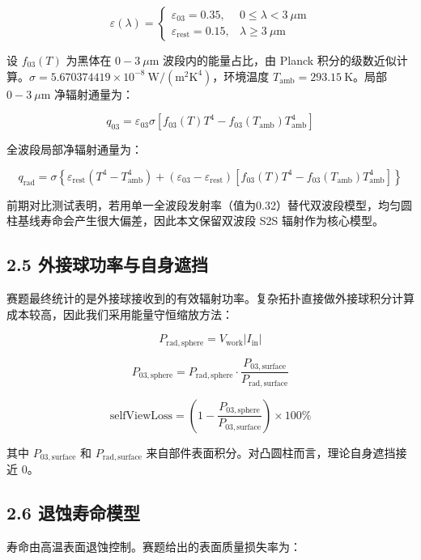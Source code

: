 \documentclass[
  a4paper,
]{ctexart}
\begin{document}
\[
\varepsilon(\lambda)=
\begin{cases}
\varepsilon_{03}=0.35, & 0\le \lambda<3\ \mu\mathrm m \\
\varepsilon_\mathrm{rest}=0.15, & \lambda\ge 3\ \mu\mathrm m
\end{cases}
\]

设 \(f_{03}(T)\) 为黑体在 \(0-3\ \mu\mathrm m\) 波段内的能量占比，由
Planck
积分的级数近似计算。\(\sigma=5.670374419\times10^{-8}\ \mathrm{W/(m^2K^4)}\)，环境温度
\(T_\mathrm{amb}=293.15\ \mathrm K\)。局部 \(0-3\ \mu\mathrm m\)
净辐射通量为：

\[
q_{03}=\varepsilon_{03}\sigma\left[f_{03}(T)T^4-f_{03}(T_\mathrm{amb})T_\mathrm{amb}^4\right]
\]

全波段局部净辐射通量为：

\[
q_\mathrm{rad}=\sigma\left\{\varepsilon_\mathrm{rest}(T^4-T_\mathrm{amb}^4)+(\varepsilon_{03}-\varepsilon_\mathrm{rest})\left[f_{03}(T)T^4-f_{03}(T_\mathrm{amb})T_\mathrm{amb}^4\right]\right\}
\]

前期对比测试表明，若用单一全波段发射率（值为0.32）替代双波段模型，均匀圆柱基线寿命会产生很大偏差，因此本文保留双波段
S2S 辐射作为核心模型。

\subsection{2.5
外接球功率与自身遮挡}\label{ux5916ux63a5ux7403ux529fux7387ux4e0eux81eaux8eabux906eux6321}

赛题最终统计的是外接球接收到的有效辐射功率。复杂拓扑直接做外接球积分计算成本较高，因此我们采用能量守恒缩放方法：

\[
P_{\mathrm{rad,sphere}}=V_\mathrm{work}|I_\mathrm{in}|
\]

\[
P_{03,\mathrm{sphere}}=P_{\mathrm{rad,sphere}}\cdot
\frac{P_{03,\mathrm{surface}}}{P_{\mathrm{rad,surface}}}
\]

\[
\mathrm{selfViewLoss}=
\left(1-\frac{P_{03,\mathrm{sphere}}}{P_{03,\mathrm{surface}}}\right)\times100\%
\]

其中 \(P_{03,\mathrm{surface}}\) 和 \(P_{\mathrm{rad,surface}}\)
来自部件表面积分。对凸圆柱而言，理论自身遮挡接近 0。

\subsection{2.6
退蚀寿命模型}\label{ux9000ux8680ux5bffux547dux6a21ux578b}

寿命由高温表面退蚀控制。赛题给出的表面质量损失率为：
\end{document}
